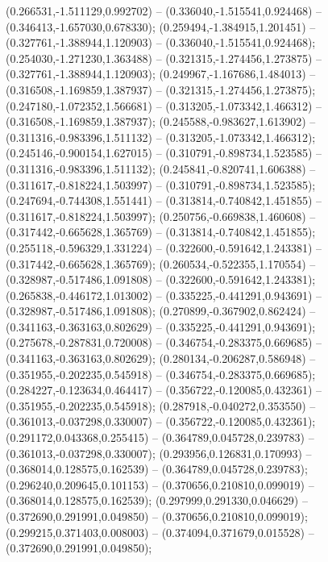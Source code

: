  (0.266531,-1.511129,0.992702) -- (0.336040,-1.515541,0.924468) -- (0.346413,-1.657030,0.678330);
 (0.259494,-1.384915,1.201451) -- (0.327761,-1.388944,1.120903) -- (0.336040,-1.515541,0.924468);
 (0.254030,-1.271230,1.363488) -- (0.321315,-1.274456,1.273875) -- (0.327761,-1.388944,1.120903);
 (0.249967,-1.167686,1.484013) -- (0.316508,-1.169859,1.387937) -- (0.321315,-1.274456,1.273875);
 (0.247180,-1.072352,1.566681) -- (0.313205,-1.073342,1.466312) -- (0.316508,-1.169859,1.387937);
 (0.245588,-0.983627,1.613902) -- (0.311316,-0.983396,1.511132) -- (0.313205,-1.073342,1.466312);
 (0.245146,-0.900154,1.627015) -- (0.310791,-0.898734,1.523585) -- (0.311316,-0.983396,1.511132);
 (0.245841,-0.820741,1.606388) -- (0.311617,-0.818224,1.503997) -- (0.310791,-0.898734,1.523585);
 (0.247694,-0.744308,1.551441) -- (0.313814,-0.740842,1.451855) -- (0.311617,-0.818224,1.503997);
 (0.250756,-0.669838,1.460608) -- (0.317442,-0.665628,1.365769) -- (0.313814,-0.740842,1.451855);
 (0.255118,-0.596329,1.331224) -- (0.322600,-0.591642,1.243381) -- (0.317442,-0.665628,1.365769);
 (0.260534,-0.522355,1.170554) -- (0.328987,-0.517486,1.091808) -- (0.322600,-0.591642,1.243381);
 (0.265838,-0.446172,1.013002) -- (0.335225,-0.441291,0.943691) -- (0.328987,-0.517486,1.091808);
 (0.270899,-0.367902,0.862424) -- (0.341163,-0.363163,0.802629) -- (0.335225,-0.441291,0.943691);
 (0.275678,-0.287831,0.720008) -- (0.346754,-0.283375,0.669685) -- (0.341163,-0.363163,0.802629);
 (0.280134,-0.206287,0.586948) -- (0.351955,-0.202235,0.545918) -- (0.346754,-0.283375,0.669685);
 (0.284227,-0.123634,0.464417) -- (0.356722,-0.120085,0.432361) -- (0.351955,-0.202235,0.545918);
 (0.287918,-0.040272,0.353550) -- (0.361013,-0.037298,0.330007) -- (0.356722,-0.120085,0.432361);
 (0.291172,0.043368,0.255415) -- (0.364789,0.045728,0.239783) -- (0.361013,-0.037298,0.330007);
 (0.293956,0.126831,0.170993) -- (0.368014,0.128575,0.162539) -- (0.364789,0.045728,0.239783);
 (0.296240,0.209645,0.101153) -- (0.370656,0.210810,0.099019) -- (0.368014,0.128575,0.162539);
 (0.297999,0.291330,0.046629) -- (0.372690,0.291991,0.049850) -- (0.370656,0.210810,0.099019);
 (0.299215,0.371403,0.008003) -- (0.374094,0.371679,0.015528) -- (0.372690,0.291991,0.049850);
